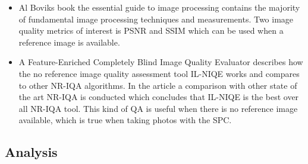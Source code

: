 \begin{itemize}

    \item Al Boviks book the essential guide to image processing \cite{book:image_processing} contains the majority of fundamental image processing techniques and measurements. Two image quality metrics of interest is PSNR and SSIM which can be used when a reference image is available.
    
    \item \cite{article:il_niqe} A Feature-Enriched Completely Blind Image
    Quality Evaluator describes how the no reference image quality assessment tool IL-NIQE works and compares to other NR-IQA algorithms. In the article a comparison with other state of the art NR-IQA is conducted which concludes that IL-NIQE is the best over all NR-IQA tool. This kind of QA is useful when there is no reference image available, which is true when taking photos with the SPC.
    
    
\end{itemize}



\subsection{Analysis}